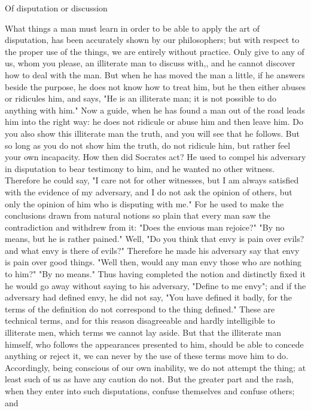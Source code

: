 \documentclass[a4paper]{article}
\begin{document}
Of disputation or discussion

    What things a man must learn in order to be able to apply the art of
disputation, has been accurately shown by our philosophers; but with respect to
the proper use of the things, we are entirely without practice. Only give to
any of us, whom you please, an illiterate man to discuss with,, and he cannot
discover how to deal with the man. But when he has moved the man a little, if
he answers beside the purpose, he does not know how to treat him, but he then
either abuses or ridicules him, and says, "He is an illiterate man; it is not
possible to do anything with him." Now a guide, when he has found a man out of
the road leads him into the right way: he does not ridicule or abuse him and
then leave him. Do you also show this illiterate man the truth, and you will
see that he follows. But so long as you do not show him the truth, do not
ridicule him, but rather feel your own incapacity.
    How then did Socrates act? He used to compel his adversary in disputation
to bear testimony to him, and he wanted no other witness. Therefore he could
say, "I care not for other witnesses, but I am always satisfied with the
evidence of my adversary, and I do not ask the opinion of others, but only the
opinion of him who is disputing with me." For he used to make the conclusions
drawn from natural notions so plain that every man saw the contradiction and
withdrew from it: "Does the envious man rejoice?" "By no means, but he is
rather pained." Well, "Do you think that envy is pain over evils? and what envy
is there of evils?" Therefore he made his adversary say that envy is pain over
good things. "Well then, would any man envy those who are nothing to him?" "By
no means." Thus having completed the notion and distinctly fixed it he would go
away without saying to his adversary, "Define to me envy"; and if the adversary
had defined envy, he did not say, "You have defined it badly, for the terms of
the definition do not correspond to the thing defined." These are technical
terms, and for this reason disagreeable and hardly intelligible to illiterate
men, which terms we cannot lay aside. But that the illiterate man himself, who
follows the appearances presented to him, should be able to concede anything or
reject it, we can never by the use of these terms move him to do. Accordingly,
being conscious of our own inability, we do not attempt the thing; at least
such of us as have any caution do not. But the greater part and the rash, when
they enter into such disputations, confuse themselves and confuse others; and
\end{document}
